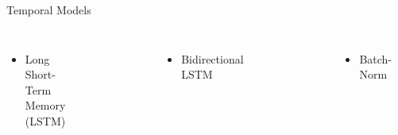 \documentclass[xcolor=table]{beamer}
\begin{document}
\begin{frame}{Temporal Models}
    \begin{columns}
    \begin{itemize}
        \item Long Short-Term Memory (LSTM)
    \end{itemize}
    \vspace{-.5cm}
    \begin{figure}
        \includegraphics[width=.5\textwidth]{fig/lstm.png}   
    \end{figure}
    \vspace{-.5cm}
    \begin{itemize}
        \item Bidirectional LSTM 
    \end{itemize}
    \vspace{-.5cm}
    \begin{figure}
        \includegraphics[width=0.5\textwidth]{fig/biLstm.png}   
    \end{figure}
    \begin{itemize}
        \item Batch-Norm 
    \end{itemize}
    \begin{figure}
        \includegraphics[width=\textwidth]{fig/batchNorm}   
    \end{figure}
    \end{columns}
\end{frame}
\end{document}
